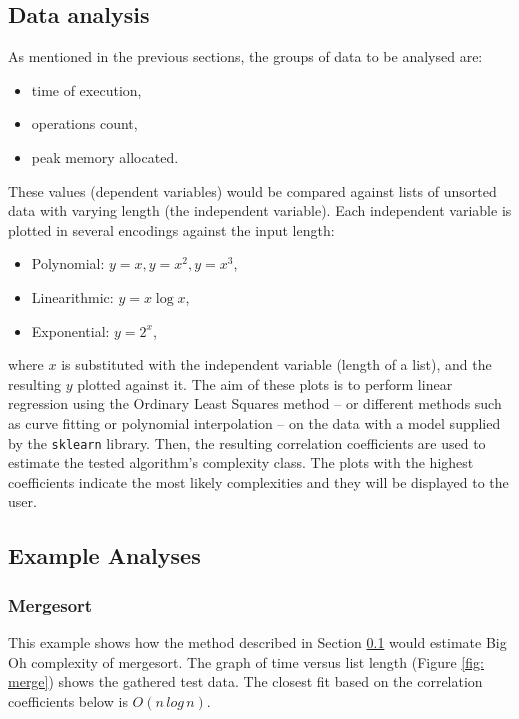 \documentclass{article}
\begin{document}
        \subsection{Data analysis} \label{dataAnalysis}
                As mentioned in the previous sections, the groups of data to be analysed are:
                \begin{itemize}
                    \item time of execution,
                    \item operations count,
                    \item peak memory allocated.
                \end{itemize}
                These values (dependent variables) would be compared against lists of unsorted data with varying length (the independent variable).  Each independent variable is plotted in several encodings against the input length:
                \begin{itemize}
                    \item Polynomial: $y = x, y = x^2, y=x^3$,
                    \item Linearithmic: $y=x \log x$,
                    \item Exponential: $y=2^x$,
                \end{itemize}
                where $x$ is substituted with the independent variable (length of a list), and the resulting $y$ plotted against it.
                The aim of these plots is to perform linear regression using the Ordinary Least Squares method – or different methods such as curve fitting or polynomial interpolation – on the data with a model supplied by the \verb|sklearn| library. Then, the resulting correlation coefficients are used to estimate the tested algorithm's  complexity class. The plots with the highest coefficients indicate the most likely complexities and they will be displayed to the user.\\

        \subsection{Example Analyses}
            \subsubsection{Mergesort}
            This example shows how the method described in Section \ref{dataAnalysis} would estimate Big Oh complexity of mergesort. The graph of time versus list length (Figure \ref{fig: merge}) shows the gathered test data. The closest fit based on the correlation coefficients below is $O(n\,log \,n)$. \\
            
\end{document}
